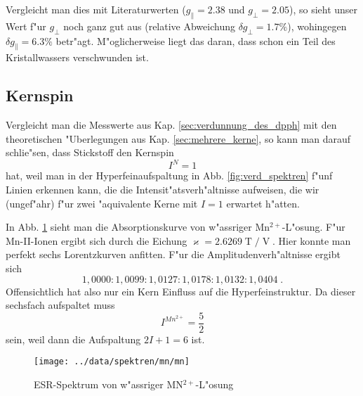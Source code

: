 \documentclass[a4paper,12pt]{article}
\newcommand{\abs}[0]{\bigskip\noindent}
\begin{document}
Vergleicht man dies mit Literaturwerten ($g_\parallel = 2.38$ und
$g_\perp = 2.05$), so sieht unser Wert f"ur $g_\perp$ noch ganz gut
aus (relative Abweichung $\delta g_\perp = 1.7\%$), wohingegen $\delta
g_\parallel = 6.3\%$ betr"agt. M"oglicherweise liegt das daran, dass
schon ein Teil des Kristallwassers verschwunden ist.









\subsection{Kernspin}
\label{sec:kernspin}

Vergleicht man die Messwerte aus Kap. \ref{sec:verdunnung_des_dpph}
mit den theoretischen "Uberlegungen aus Kap. \ref{sec:mehrere_kerne},
so kann man darauf schlie"sen, dass Stickstoff den Kernspin
\begin{equation*}
  I^N = 1
\end{equation*}
hat, 
weil man in der Hyperfeinaufspaltung in Abb. \ref{fig:verd_spektren}
f"unf Linien erkennen kann, die die Intensit"atsverh"altnisse
aufweisen, die wir (ungef"ahr) f"ur zwei "aquivalente Kerne mit $I=1$
erwartet h"atten.

\abs 
%
In Abb. \ref{fig:mn} sieht man die Absorptionskurve von w"assriger
Mn$^{2+}$-L"osung. F"ur Mn-II-Ionen ergibt sich durch die Eichung
  $\varkappa = 2.6269 \operatorname{T}/\operatorname{V}$. Hier konnte
man perfekt sechs Lorentzkurven anfitten. F"ur die
Amplitudenverh"altnisse ergibt sich
\begin{equation*}
1,0000 : 1,0099 : 1,0127 : 1,0178 : 1,0132 : 1,0404 \;.
\end{equation*}
Offensichtlich hat also nur ein Kern Einfluss auf die
Hyperfeinstruktur. Da dieser sechsfach aufspaltet muss
\begin{equation*}
  I^{Mn^{2+}} = \frac 5  2
\end{equation*}
sein, weil dann die Aufspaltung $2I+1 = 6$ ist.


\begin{figure}[!h]
  \centering
  \texttt{[image: ../data/spektren/mn/mn]}
  \caption{ESR-Spektrum von w"assriger MN$^{2+}$-L"osung}
  \label{fig:mn}
\end{figure}
\end{document}

